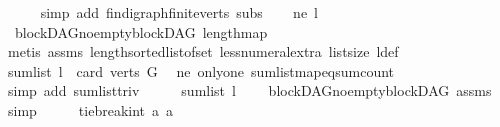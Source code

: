 \begin{isabellebody}
\ \ \ \ \isamarkupfalse%
\ {\isacharparenleft}{\kern0pt}simp\ add{\isacharcolon}{\kern0pt}\ fin{\isacharunderscore}{\kern0pt}digraph{\isachardot}{\kern0pt}finite{\isacharunderscore}{\kern0pt}verts\ subs{\isacharparenright}{\kern0pt}\isanewline
\ \ \isamarkupfalse%
\ ne{\isacharcolon}{\kern0pt}\ {\isachardoublequoteopen}l\ {\isasymnoteq}\ {\isacharbrackleft}{\kern0pt}{\isacharbrackright}{\kern0pt}{\isachardoublequoteclose}\isanewline
\ \ \ \ \isamarkupfalse%
\ \ blockDAG{\isachardot}{\kern0pt}no{\isacharunderscore}{\kern0pt}empty{\isacharunderscore}{\kern0pt}blockDAG\ length{\isacharunderscore}{\kern0pt}map\isanewline
\ \ \ \ \isamarkupfalse%
\ {\isacharparenleft}{\kern0pt}metis\ assms{\isacharparenleft}{\kern0pt}{}{\isacharparenright}{\kern0pt}\ length{\isacharunderscore}{\kern0pt}sorted{\isacharunderscore}{\kern0pt}list{\isacharunderscore}{\kern0pt}of{\isacharunderscore}{\kern0pt}set\ less{\isacharunderscore}{\kern0pt}numeral{\isacharunderscore}{\kern0pt}extra{\isacharparenleft}{\kern0pt}{}{\isacharparenright}{\kern0pt}\ list{\isachardot}{\kern0pt}size{\isacharparenleft}{\kern0pt}{}{\isacharparenright}{\kern0pt}\ l{\isacharunderscore}{\kern0pt}def{\isacharparenright}{\kern0pt}\isanewline
\ \ \isamarkupfalse%
\ {\isachardoublequoteopen}sum{\isacharunderscore}{\kern0pt}list\ l\ {\isacharequal}{\kern0pt}\ card\ {\isacharparenleft}{\kern0pt}verts\ G{\isacharparenright}{\kern0pt}{\isachardoublequoteclose}\ \isamarkupfalse%
\ ne\ only{\isacharunderscore}{\kern0pt}one\ sum{\isacharunderscore}{\kern0pt}list{\isacharunderscore}{\kern0pt}map{\isacharunderscore}{\kern0pt}eq{\isacharunderscore}{\kern0pt}sum{\isacharunderscore}{\kern0pt}count\isanewline
\ \ \ \ \isamarkupfalse%
\ {\isacharparenleft}{\kern0pt}simp\ add{\isacharcolon}{\kern0pt}\ sum{\isacharunderscore}{\kern0pt}list{\isacharunderscore}{\kern0pt}triv{\isacharparenright}{\kern0pt}\isanewline
\ \ \isamarkupfalse%
\ \isamarkupfalse%
\ {\isachardoublequoteopen}sum{\isacharunderscore}{\kern0pt}list\ l\ {\isachargreater}{\kern0pt}\ {}{\isachardoublequoteclose}\ \isamarkupfalse%
\ blockDAG{\isachardot}{\kern0pt}no{\isacharunderscore}{\kern0pt}empty{\isacharunderscore}{\kern0pt}blockDAG\ assms{\isacharparenleft}{\kern0pt}{}{\isacharparenright}{\kern0pt}\ \isamarkupfalse%
\ simp\isanewline
\ \ \isamarkupfalse%
\ \isamarkupfalse%
\ {\isachardoublequoteopen}tie{\isacharunderscore}{\kern0pt}break{\isacharunderscore}{\kern0pt}int\ a\ a\isanewline

\end{isabellebody}
